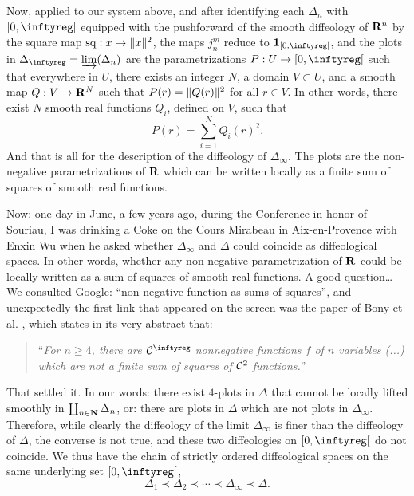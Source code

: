 Now,
applied to our system above,
and after identifying each $\Delta_n$ with $\LeftClosedInterval{0,\infty}$ equipped with the pushforward of the smooth diffeology of $\mathbf{R}^n$ by the square map ${\operatorname{sq}}: x \mapsto \Vert x \Vert^2$,
the maps $j_n^m$ reduce to $\Id_{\LeftClosedInterval{0,\infty}}$,
and the plots in $\Delta_\infty = \varinjlim (\Delta_n)$ are the parametrizations $P : U \to \LeftClosedInterval{0,\infty}$ such that everywhere in $U$,
there exists an integer $N$,
a domain $V \subset U$,
and a smooth map $Q : V \to \mathbf{R}^N$ such that $P(r) = \Vert Q(r) \Vert^2$ for all $r \in V$.
In other words,
there exist $N$ smooth real functions $Q_i$,
defined on $V$,
such that
$$
  P(r) = \sum_{i = 1}^N Q_i(r)^2.
  $$
And that is all for the description of the diffeology of $\Delta_\infty$.
The plots are the non-negative parametrizations of $\mathbf{R}$ which can be written locally as a finite sum of squares of smooth real functions.

Now: one day in June,
a few years ago,
during the Conference in honor of Souriau,
I was drinking a Coke on the Cours Mirabeau in Aix-en-Provence with Enxin Wu when he asked whether $\Delta_\infty$ and $\Delta$ could coincide as diffeological spaces.
In other words,
whether any non-negative parametrization of $\mathbf{R}$ could be locally written as a sum of squares of smooth real functions.
A good question\dots
We consulted Google:
``non negative function as sums of squares'',
and unexpectedly the first link that appeared on the screen was the paper of Bony et al. \cite{BBCP06},
which states in its very abstract that:
%
\begin{quote} ``{\em For $n \geq 4$, there are $\Cinfty$
  nonnegative functions $f$ of $n$ variables (...)
  which are not a finite sum of squares of ${\mathcal{C}}^{2}$ functions.}''
\end{quote}
%
That settled it.
In our words:
there exist $4$-plots in $\Delta$ that cannot be locally lifted smoothly in $\coprod_{n \in \mathbf{N}} \Delta_n$,
or:
there are plots in $\Delta$ which are not plots in $\Delta_\infty$.
Therefore,
while clearly the diffeology of the limit $\Delta_\infty$ is finer than the diffeology of $\Delta$,
the converse is not true,
and these two diffeologies on $\LeftClosedInterval{0,\infty}$ do not coincide.
We thus have the chain of strictly ordered diffeological spaces on the same underlying set
$\LeftClosedInterval{0,\infty}$,
$$
  \Delta_1 \prec \Delta_2 \prec \cdots \prec \Delta_\infty \prec \Delta.
  $$%
